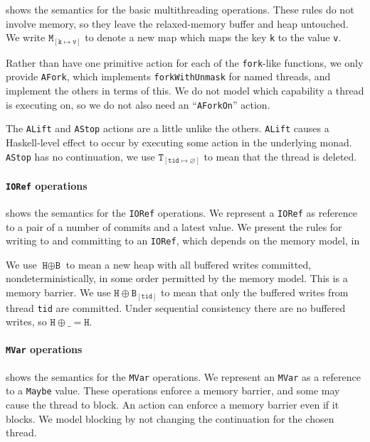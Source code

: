  shows the semantics for the basic
multithreading operations.  These rules do not involve memory, so they
leave the relaxed-memory buffer and heap untouched.  We write
$\texttt{M}_{[\texttt{k} \mapsto \texttt{v}]}$ to denote a new map
which maps the key \texttt{k} to the value \texttt{v}.

Rather than have one primitive action for each of the \verb|fork|-like
functions, we only provide \verb|AFork|, which implements
\verb|forkWithUnmask| for named threads, and implement the others in
terms of this.  We do not model which capability a thread is executing
on, so we do not also need an ``\verb|AForkOn|'' action.

The \verb|ALift| and \verb|AStop| actions are a little unlike the
others.  \verb|ALift| causes a Haskell-level effect to occur by
executing some action in the underlying monad.  \verb|AStop| has no
continuation, we use $\texttt{T}_{[\texttt{tid}\mapsto\varnothing]}$
to mean that the thread is deleted.

\paragraph{\texttt{IORef} operations}
 shows the semantics for the \verb|IORef|
operations.  We represent a \verb|IORef| as reference to a pair of a
number of commits and a latest value.  We present the rules for
writing to and committing to an \verb|IORef|, which depends on the
memory model, in 

We use $\texttt{H} \oplus \texttt{B}$ to mean a new heap with all
buffered writes committed, nondeterministically, in some order
permitted by the memory model.  This is a memory barrier.  We use
$\texttt{H} \oplus \texttt{B}_{[\texttt{tid}]}$ to mean that only the
buffered writes from thread \verb|tid| are committed.  Under
sequential consistency there are no buffered writes, so
$\texttt{H} \oplus \texttt{\_} = \texttt{H}$.

\paragraph{\texttt{MVar} operations}
 shows the semantics for the \verb|MVar|
operations.  We represent an \verb|MVar| as a reference to a
\verb|Maybe| value.  These operations enforce a memory barrier, and
some may cause the thread to block.  An action can enforce a memory
barrier even if it blocks.  We model blocking by not changing the
continuation for the chosen thread.

